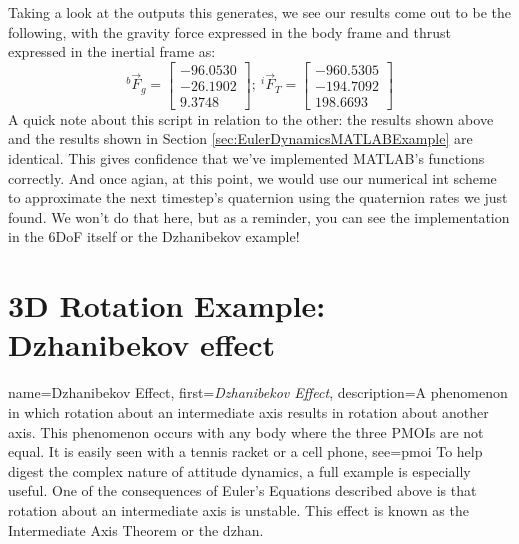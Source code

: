 \documentclass[12pt]{report}
\begin{document}
\lstset{style=mystyle}

\label{Quat Dynamics Listing}

Taking a look at the outputs this generates, we see our results come out to be the following, with the gravity force expressed in the \gls{body frame} and thrust expressed in the \gls{inertial frame} as:
\begin{equation}
    ^b\vec{F}_{g}=\begin{bmatrix}
        -96.0530\\-26.1902\\9.3748
    \end{bmatrix};\ ^i\vec{F}_{T}=\begin{bmatrix}
        -960.5305\\-194.7092\\198.6693
    \end{bmatrix}
\end{equation}
A quick note about this script in relation to the other: the results shown above and the results shown in Section \ref{sec:EulerDynamicsMATLABExample} are identical. This gives confidence that we've implemented MATLAB's functions correctly. And once agian, at this point, we would use our \gls{numerical int} scheme to approximate the next timestep's \gls{quaternion} using the \gls{quaternion} rates we just found. We won't do that here, but as a reminder, you can see the implementation in the 6DoF itself or the Dzhanibekov example! 

\section{3D Rotation Example: Dzhanibekov effect}\label{sec:Dzhan}

{
    name={Dzhanibekov Effect},
    first=\textit{Dzhanibekov Effect},
    description={A phenomenon in which rotation about an intermediate axis results in rotation about another axis. This phenomenon occurs with any body where the three PMOIs are not equal. It is easily seen with a tennis racket or a cell phone},
    see={pmoi}
}
To help digest the complex nature of attitude dynamics, a full example is especially useful. One of the consequences of Euler's Equations described %
above is that rotation about an intermediate axis is unstable. This effect is known as the Intermediate Axis Theorem or the \gls{dzhan}.
\end{document}
